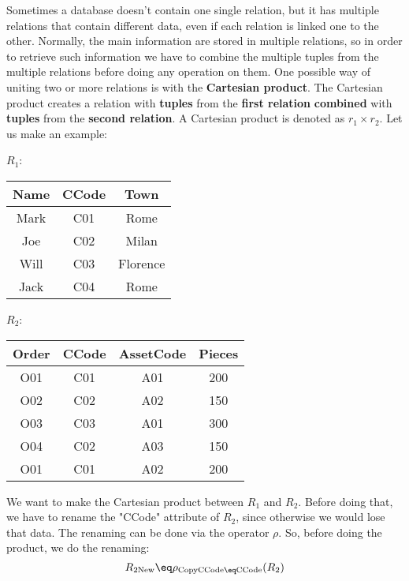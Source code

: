 Sometimes a database doesn't contain one single relation, but it has multiple relations that contain different data, even if each relation is linked one to the other. Normally, the main information are stored in multiple relations, so in order to retrieve such information we have to combine the multiple tuples from the multiple relations before doing any operation on them.
\nwl
One possible way of uniting two or more relations is with the \textbf{Cartesian product}. The Cartesian product creates a relation with \textbf{tuples} from the \textbf{first relation} \textbf{combined} with \textbf{tuples} from the \textbf{second relation}. A Cartesian product is denoted as $r_1 \times r_2$. Let us make an example:

\begin{center}
    $R_1$: \quad \begin{tabular}{|c|c|c|}
        \hline \rowcolor{maindoccol!60}
        \textbf{Name} & \textbf{CCode} & \textbf{Town} \\
        \hline
        Mark & C01 & Rome \\
        \hline
        Joe & C02 & Milan \\
        \hline
        Will & C03 & Florence \\
        \hline
        Jack & C04 & Rome \\
        \hline
    \end{tabular}
    \quad $R_2$: \quad \begin{tabular}{|c|c|c|c|}
        \hline \rowcolor{maindoccol!60}
        \textbf{Order} & \textbf{CCode} & \textbf{AssetCode} & \textbf{Pieces} \\
        \hline
        O01 & C01 & A01 & 200 \\
        \hline
        O02 & C02 & A02 & 150 \\
        \hline
        O03 & C03 & A01 & 300 \\
        \hline
        O04 & C02 & A03 & 150 \\
        \hline
        O01 & C01 & A02 & 200 \\
        \hline
    \end{tabular}
\end{center}

We want to make the Cartesian product between $R_1$ and $R_2$. Before doing that, we have to rename the "CCode" attribute of $R_2$, since otherwise we would lose that data. The renaming can be done via the operator $\rho$. So, before doing the product, we do the renaming:
\[ R_{2\text{New}} \eq \rho_{\text{CopyCCode} \eq \text{CCode}}(R_2) \]


